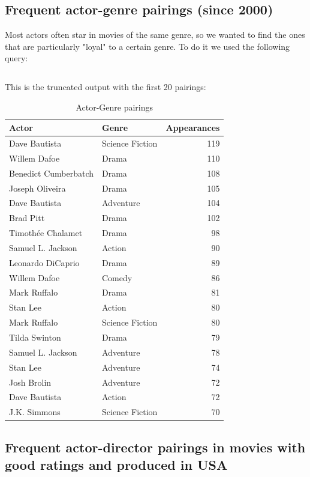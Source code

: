 \documentclass{Configuration_Files/PoliMi3i_thesis}
\begin{document}
\subsection{Frequent actor-genre pairings (since 2000)}

Most actors often star in movies of the same genre, so we wanted to find the ones that are particularly "loyal" to a certain genre. To do it we used the following query:

\inputminted[frame=single,framesep=10pt,breaklines]{cypher}{letterboxd/queries/query8.cypher}

This is the truncated output with the first 20 pairings:

\begin{table}[!h]
\centering
\begin{tabular}{|l|l|r|}
\hline
\textbf{Actor} & \textbf{Genre} & \textbf{Appearances} \\
\hline
Dave Bautista & Science Fiction & 119 \\
Willem Dafoe & Drama & 110 \\
Benedict Cumberbatch & Drama & 108 \\
Joseph Oliveira & Drama & 105 \\
Dave Bautista & Adventure & 104 \\
Brad Pitt & Drama & 102 \\
Timothée Chalamet & Drama & 98 \\
Samuel L. Jackson & Action & 90 \\
Leonardo DiCaprio & Drama & 89 \\
Willem Dafoe & Comedy & 86 \\
Mark Ruffalo & Drama & 81 \\
Stan Lee & Action & 80 \\
Mark Ruffalo & Science Fiction & 80 \\
Tilda Swinton & Drama & 79 \\
Samuel L. Jackson & Adventure & 78 \\
Stan Lee & Adventure & 74 \\
Josh Brolin & Adventure & 72 \\
Dave Bautista & Action & 72 \\
J.K. Simmons & Science Fiction & 70 \\
\hline
\end{tabular}
\caption{Actor-Genre pairings}
\end{table}

\subsection{Frequent actor-director pairings in movies with good ratings and produced in USA
}
\end{document}
